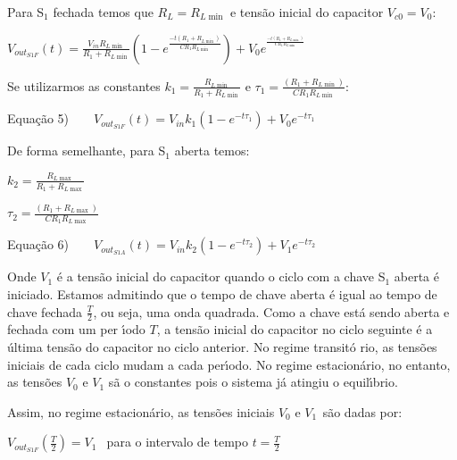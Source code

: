 \documentclass{article}
\begin{document}
\vspace{1pt}

Para S$_{\text{1}}$ fechada temos que $R_{L}=R_{L\min }$ e tens\~{a}o
inicial do capacitor $V_{c0}=V_{0}:$

$V_{out_{S1F}}\left( t\right) =\frac{V_{in}R_{L\min }}{R_{1}+R_{L\min }}%
\left( 1-e^{\frac{-t\left( R_{1}+R_{L\min }\right) }{CR_{1}R_{L\min }}%
}\right) +V_{0}e^{^{\frac{-t\left( R_{1}+R_{L\min }\right) }{CR_{1}R_{L\min }%
}}}$

Se utilizarmos as constantes $k_{1}=\frac{R_{L\min }}{R_{1}+R_{L\min }}$ e $%
\tau _{1}=\frac{\left( R_{1}+R_{L\min }\right) }{CR_{1}R_{L\min }}:$

Equa\c{c}\~{a}o 5)$\qquad V_{out_{S1F}}\left( t\right) =V_{in}k_{1}\left(
1-e^{-t\tau _{1}}\right) +V_{0}e^{-t\tau _{1}}$

\vspace{1pt}

De forma semelhante, para S$_{\text{1}}$ aberta temos:

$k_{2}=\frac{R_{L\max }}{R_{1}+R_{L\max }}$

$\tau _{2}=\frac{\left( R_{1}+R_{L\max }\right) }{CR_{1}R_{L\max }}$

\vspace{1pt}

\vspace{1pt}Equa\c{c}\~{a}o 6)$\qquad V_{out_{S1A}}\left( t\right)
=V_{in}k_{2}\left( 1-e^{-t\tau _{2}}\right) +V_{1}e^{-t\tau _{2}}$

\vspace{1pt}

Onde $V_{1}$ \'{e} a tens\~{a}o inicial do capacitor quando o ciclo com a
chave S$_{\text{1}}$ aberta \'{e} iniciado. Estamos admitindo que o tempo de
chave aberta \'{e} igual ao tempo de chave fechada $\frac{T}{2}$, ou seja,
uma onda quadrada. Como a chave est\'{a} sendo aberta e fechada com um per%
\'{\i}odo $T$, a tens\~{a}o inicial do capacitor no ciclo seguinte \'{e} a 
\'{u}ltima tens\~{a}o do capacitor no ciclo anterior. No regime transit\'{o}%
rio, as tens\~{o}es iniciais de cada ciclo mudam a cada per\'{\i}odo. No
regime estacion\'{a}rio, no entanto, as tens\~{o}es $V_{0}$ e $V_{1}$ s\~{a}%
o constantes pois o sistema j\'{a} atingiu o equil\'{\i}brio.

Assim, no regime estacion\'{a}rio, as tens\~{o}es iniciais $V_{0}$ e $V_{1%
\text{ }}$s\~{a}o dadas por:

\vspace{1pt}$V_{out_{S1F}}\left( \frac{T}{2}\right) =V_{1\text{ }}$ para o
intervalo de tempo $t=\frac{T}{2}$
\end{document}
